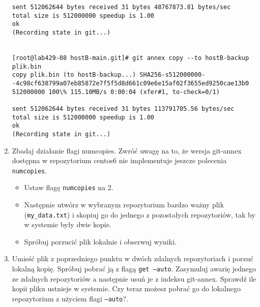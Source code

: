 \documentclass[polish]{article}
\newif\ifteacher
\begin{document}
\begin{enumerate}
\begin{lstlisting}
sent 512062644 bytes received 31 bytes 48767873.81 bytes/sec
total size is 512000000 speedup is 1.00
ok
(Recording state in git...)


[root@lab429-08 hostB-main.git]# git annex copy --to hostB-backup plik.bin
copy plik.bin (to hostB-backup...) SHA256-s512000000--4c98cf638799a07eb85872e7f5f5d8d661c09e6e15af02f3655ed9250cae13b0
512000000 100\% 115.10MB/s 0:00:04 (xfer#1, to-check=0/1)

sent 512062644 bytes received 31 bytes 113791705.56 bytes/sec
total size is 512000000 speedup is 1.00
ok
(Recording state in git...)
    \end{lstlisting}
\fi

    \item
    Zbadaj działanie flagi numcopies. Zwróć uwagę na to, że wersja git-annex
    dostępna w repozytorium centos6 nie implementuje jeszcze polecenia
    \texttt{numcopies}.

    \begin{itemize}
        \item Ustaw flagę \texttt{numcopies} na 2.
        \item Następnie utwórz w wybranym repozytorium bardzo ważny plik
              (\texttt{my\_data.txt}) i skopiuj go do jednego z pozostałych
              repozytoriów, tak by w systemie były dwie kopie.
        \item Spróbuj porzucić plik lokalnie i obserwuj wyniki.
    \end{itemize}

    \item
    Umieść plik z poprzedniego punktu w dwóch zdalnych repozytoriach i porzuć
    lokalną kopię. Spróbuj pobrać ją z flagą \texttt{get --auto}. Zasymuluj
    awarię jednego ze zdalnych repozytoriów a następnie usuń je z indeksu
    git-annex. Sprawdź ile kopii pliku ustnieje w systemie. Czy teraz możesz
    pobrać go do lokalnego repozytorium z użyciem flagi \texttt{--auto}?.

\ifteacher
    \begin{lstlisting}
[root@lab429-08 hostB-main.git]# git annex get --auto plik.bin
get plik.bin (from hostB-backup...) SHA256-s512000000--4c98cf638799a07eb85872e7f5f5d8d661c09e6e15af02f3655ed9250cae13b0
512000000 100\% 56.26MB/s 0:00:08 (xfer#1, to-check=0/1)

sent 512062644 bytes received 31 bytes 53901334.21 bytes/sec
total size is 512000000 speedup is 1.00
ok
(Recording state in git...)
    \end{lstlisting}
\fi


\end{enumerate}
\end{document}
